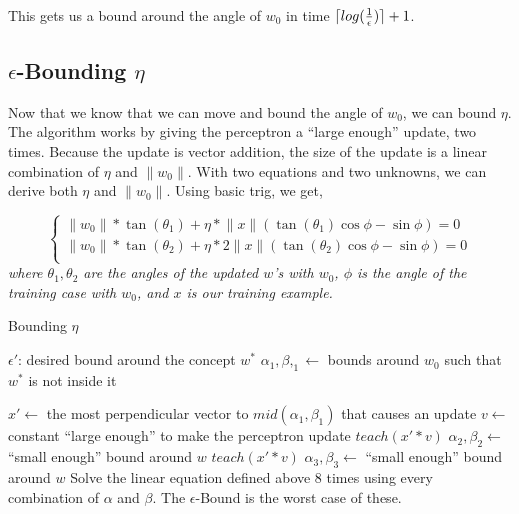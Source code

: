 \documentclass{article}
\DeclarePairedDelimiter{\ceil}{\lceil}{\rceil}
\begin{document}
This gets us a bound around the angle of $w_0$ in time $\ceil{log(\frac{1}{\epsilon})} +
1$.

\subsection{$\epsilon$-Bounding $\eta$}

Now that we know that we can move and bound the angle of $w_0$, we can bound
$\eta$. The algorithm works by giving the perceptron a ``large enough'' update,
two times. Because the update is vector addition, the size of the update is a
linear combination of $\eta$ and $\lVert w_0 \rVert$. With two equations and two
unknowns, we can derive both $\eta$ and $\lVert w_0 \rVert$. Using basic trig,
we get,

\[
  \begin{cases}
    \lVert w_0 \rVert * \tan(\theta_1) + \eta * \lVert x \rVert (\tan(\theta_1)  
    \cos{\phi} - \sin{\phi}) = 0 \\

    \lVert w_0 \rVert * \tan(\theta_2) + \eta * 2 \lVert x \rVert (\tan(\theta_2)
    \cos{\phi} - \sin{\phi}) = 0 \\
  \end{cases}
\]
\textit{where $\theta_1, \theta_2$ are the angles of the updated $w$'s with
  $w_0$, $\phi$ is the angle of the training case with $w_0$, and $x$ is our
  training example.}


\begin{algorithm}
\caption{Bounding $\eta$}
\begin{algorithmic}[1]
	\REQUIRE $\epsilon'$: desired bound around the concept $w^*$
  \STATE $\alpha_1, \beta,_1 \leftarrow$ bounds around $w_0$ such that $w^*$ is not
  inside it

  \STATE $x' \leftarrow $ the most perpendicular vector to $mid(\alpha_1, \beta_1)$
  that causes an update
  \STATE $v \leftarrow$ constant ``large enough'' to make the perceptron update
  \STATE $teach(x' * v)$
  \STATE $\alpha_2, \beta_2 \leftarrow$ ``small enough'' bound around $w$
  \STATE $teach(x' * v)$
  \STATE $\alpha_3, \beta_3 \leftarrow$ ``small enough'' bound around $w$
  \STATE Solve the linear equation defined above 8 times using every combination of
  $\alpha$ and $\beta$. The $\epsilon$-Bound is the worst case of these.
\end{algorithmic}
\end{algorithm}
\end{document}
